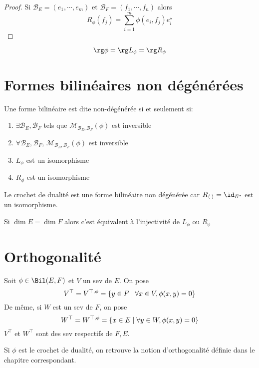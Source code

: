 \begin{proof}
    Si $\mathcal  B_E=(e_1, \cdots , e_m)$ et $\mathcal  B_F=(f_1, \cdots , f_n)$ alors \[
        R_\phi(f_j)=\sum_{i=1}^m \phi(e_i, f_j)e_i^\star
    \] 
\end{proof}

\begin{cor}
\[
\rg \phi=\rg L_\phi=\rg R_\phi
\] 
\end{cor}

\section{Formes bilinéaires non dégénérées}

\begin{prop}
    Une forme bilinéaire est dite non-dégénérée si et seulement si: \begin{enumerate}
        \item $\exists  \mathcal  B_E, \mathcal  B_F$ tels que $\mathcal  M_{\mathcal  B_E, \mathcal  B_F}(\phi)$ est inversible
        \item $\forall  \mathcal  B_E, \mathcal  B_F$, $\mathcal  M_{\mathcal  B_E, \mathcal  B_F}(\phi)$ est inversible
        \item $L_\phi$ est un isomorphisme
        \item  $R_\phi$ est un isomorphisme
    \end{enumerate}
\end{prop}

\begin{ex}
Le crochet de dualité est une forme bilinéaire non dégénérée car $R_{\langle\;\rangle}=\id_{E^\star}$ est un isomorphisme.
\end{ex}

\begin{rem}
Si $\dim E=\dim F$ alors c'est équivalent à l'injectivité de  $L_\phi$ ou  $R_\phi$
\end{rem}

\section{Orthogonalité}

\begin{dfn}
    Soit $\phi \in  \Bil(E, F)$ et $V$ un sev de $E$. On pose \[
        V^\top = V^{\top, \phi}= \left\{ y \in  F \suchthat \forall  x  \in  V, \phi(x, y)=0 \right\} 
    \] 
    De même, si $W$ est un sev de $F$, on pose \[
        W^\top = W^{\top, \phi}= \left\{ x \in  E \suchthat \forall  y  \in  W, \phi(x, y)=0 \right\} 
    \] 
    $V^\top$ et $W^\top$ sont des sev respectifs de $F, E$.
\end{dfn}

\begin{rem}
Si $\phi$ est le crochet de dualité, on retrouve la notion d'orthogonalité définie dans le chapitre correspondant.
\end{rem}


